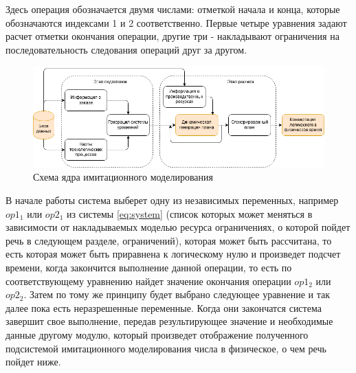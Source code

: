 \indent Здесь операция обозначается двумя числами: отметкой начала и конца, которые обозначаются индексами 1 и 2 соответственно.
Первые четыре уравнения задают расчет отметки окончания операции, другие три - накладывают ограничения на последовательность следования операций друг за другом.

\begin{figure}[ht]
	\centering
	\includegraphics[width=\linewidth]{pics/imcoreDataflow.png}
	\caption{Схема ядра имитационного моделирования}
	\label{fig:imcoreFlow}
\end{figure}

\indent В начале работы система выберет одну из независимых переменных, например $op1_1$ или $op2_1$ из системы \ref{eq:system} (список которых может меняться в зависимости от накладываемых моделью ресурса ограничениях, о которой пойдет речь в следующем разделе, ограничений), которая может быть рассчитана, то есть которая может быть приравнена к логическому нулю и произведет подсчет времени, когда закончится выполнение данной операции, то есть по соответствующему уравнению найдет значение окончания операции $op1_2$ или $op2_2$.
Затем по тому же принципу будет выбрано следующее уравнение и так далее пока есть неразрешенные переменные.
Когда они закончатся система завершит свое выполнение, передав результирующее значение и необходимые данные другому модулю, который произведет отображение полученного подсистемой имитационного моделирования числа в физическое, о чем речь пойдет ниже.